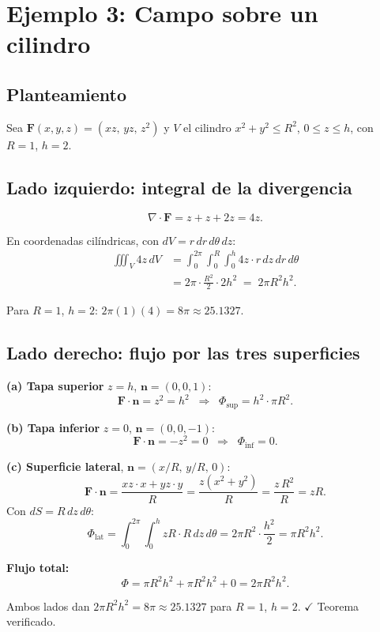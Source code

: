 \documentclass[12pt,a4paper]{article}
\begin{document}
\section{Ejemplo 3: Campo sobre un cilindro}

\subsection{Planteamiento}
Sea $\mathbf{F}(x,y,z) = (xz,\,yz,\,z^2)$ y $V$ el cilindro $x^2+y^2 \le R^2$, $0\le z\le h$, con $R=1$, $h=2$.

\subsection{Lado izquierdo: integral de la divergencia}

\[
\nabla\cdot\mathbf{F} = z + z + 2z = 4z.
\]

En coordenadas cilíndricas, con $dV = r\, dr\, d\theta\, dz$:
\begin{align*}
\iiint_V 4z\, dV
&= \int_0^{2\pi}\!\!\int_0^R\!\!\int_0^h 4z \cdot r\, dz\, dr\, d\theta \\
&= 2\pi \cdot \frac{R^2}{2} \cdot 2h^2
\;=\; 2\pi R^2 h^2.
\end{align*}

Para $R=1$, $h=2$: $2\pi(1)(4) = 8\pi \approx 25.1327$.

\subsection{Lado derecho: flujo por las tres superficies}

\textbf{(a) Tapa superior} $z=h$, $\mathbf{n}=(0,0,1)$:
\[
\mathbf{F}\cdot\mathbf{n} = z^2 = h^2
\;\;\Rightarrow\;\;
\Phi_{\text{sup}} = h^2 \cdot \pi R^2.
\]

\textbf{(b) Tapa inferior} $z=0$, $\mathbf{n}=(0,0,-1)$:
\[
\mathbf{F}\cdot\mathbf{n} = -z^2 = 0
\;\;\Rightarrow\;\;
\Phi_{\text{inf}} = 0.
\]

\textbf{(c) Superficie lateral}, $\mathbf{n}=(x/R,\,y/R,\,0)$:
\[
\mathbf{F}\cdot\mathbf{n} = \frac{xz\cdot x + yz\cdot y}{R}
= \frac{z(x^2+y^2)}{R} = \frac{z\,R^2}{R} = zR.
\]
Con $dS = R\, dz\, d\theta$:
\[
\Phi_{\text{lat}} = \int_0^{2\pi}\!\!\int_0^h zR \cdot R\, dz\, d\theta
= 2\pi R^2 \cdot \frac{h^2}{2} = \pi R^2 h^2.
\]

\textbf{Flujo total:}
\[
\Phi = \pi R^2 h^2 + \pi R^2 h^2 + 0 = 2\pi R^2 h^2.
\]

\begin{cajaresultado}
Ambos lados dan $2\pi R^2 h^2 = 8\pi \approx 25.1327$ para $R=1$, $h=2$. \hspace{0.5cm}$\checkmark$\; Teorema verificado.
\end{cajaresultado}
\end{document}
